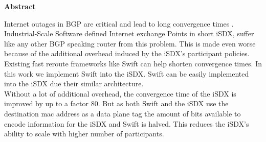 \clearpage
\null
\vfil %
\thispagestyle{plain}
\begin{center}\textbf{Abstract}\end{center}
Internet outages in BGP are critical and lead to long convergence times . \\
Industrial-Scale Software defined Internet exchange Points in short iSDX, suffer like any other BGP speaking router from this problem. This is made even worse because of the additional overhead induced by the iSDX's participant policies. Existing fast reroute frameworks like Swift can help shorten convergence times. In this work we implement Swift into the iSDX. Swift can be easily implemented into the iSDX due their similar architecture. \\
Without a lot of additional overhead, the convergence time of the iSDX is improved by up to a factor 80. But as both Swift and the iSDX use the destination mac address as a data plane tag the amount of bits available to encode information for the iSDX and Swift is halved. This reduces the iSDX's ability to scale with higher number of participants. 
\vfil
\clearpage 
